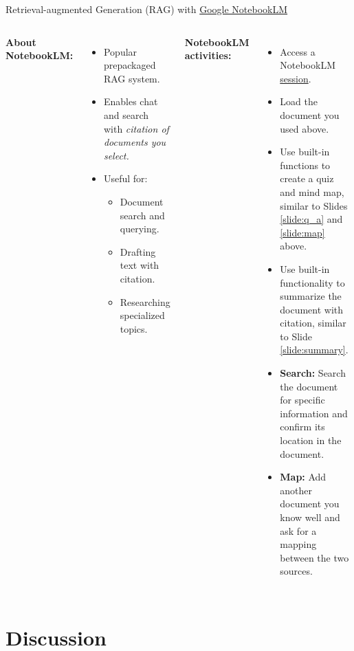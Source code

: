 \documentclass[aspectratio=169]{beamer}
\begin{document}
\begin{frame}[t]{Retrieval-augmented Generation (RAG) with \href{https://notebooklm.google.com/}{Google NotebookLM}}\label{slide:rag}

\begin{columns}[t]
    \small
    \noindent \textbf{About NotebookLM:}
    \begin{itemize}
        \item Popular prepackaged RAG system.
        \item Enables chat and search with \textit{citation of documents you select.} 
        \item Useful for:
        \begin{itemize}
            \item Document search and querying. 
            \item Drafting text with citation.
            \item Researching specialized topics. 
        \end{itemize}    
    \end{itemize}

    \small
    \noindent \textbf{NotebookLM activities:} 
    \begin{itemize}
    \item Access a NotebookLM \href{https://notebooklm.google.com/}{session}.
    \item Load the document you used above.
    \item Use built-in functions to create a quiz and mind map, similar to Slides \ref{slide:q_a} and \ref{slide:map} above.
    \item Use built-in functionality to summarize the document with citation, similar to Slide \ref{slide:summary}.
    \item \textbf{Search:} Search the document for specific information and confirm its location in the document.
    \item \textbf{Map:} Add another document you know well and ask for a mapping between the two sources.
    \end{itemize}

\end{columns}

\end{frame}


\section{Discussion}
\end{document}
